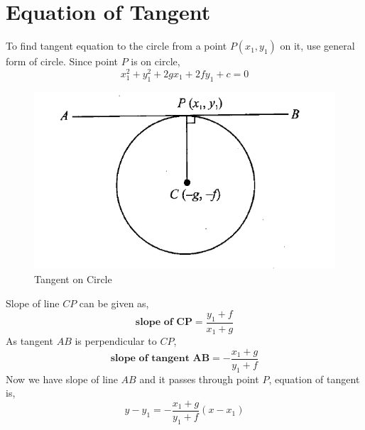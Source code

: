 \documentclass{article}
\begin{document}
\section{Equation of Tangent}
To find tangent equation to the circle from a point $P(x_1,y_1)$ on it, use general form of circle. Since point $P$ is on circle,
\begin{equation*}
    x_1^2+y_1^2+2gx_1+2fy_1+c=0
\end{equation*}
\begin{figure}[H]
    \centering
    \includegraphics[scale=0.5]{tangent_on_circle.png}
    \caption{Tangent on Circle}
\end{figure}
Slope of line $CP$ can be given as,
\begin{equation*}
    \textbf{slope of CP} = \frac{y_1+f}{x_1+g}
\end{equation*}
As tangent $AB$ is perpendicular to $CP$,
\begin{equation*}
    \textbf{slope of tangent AB} = -\frac{x_1+g}{y_1+f}
\end{equation*}
Now we have slope of line $AB$ and it passes through point $P$, equation of tangent is,
\begin{equation*}
    y-y_1=-\frac{x_1+g}{y_1+f}(x-x_1)
\end{equation*}
\end{document}
